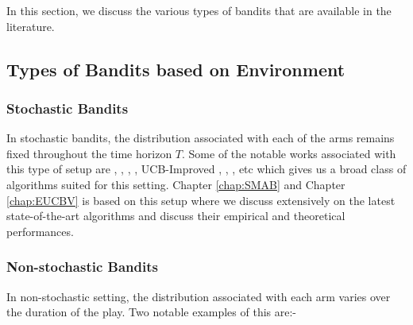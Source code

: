 In this section, we discuss the various types of bandits that are available in the literature. 


\subsection{Types of Bandits based on Environment}


\subsubsection{Stochastic Bandits}
In stochastic bandits, the distribution associated with each of the arms remains fixed throughout the time horizon $T$. Some of the notable works associated with this type of setup are \citet{robbins1952some}, \citet{lai1985asymptotically},  \citet{agrawal1995sample}, \citet{auer2002finite}, UCB-Improved \citet{auer2010ucb}, \citet{audibert2009minimax}, \citet{lattimore2015optimally}, etc which gives us a broad class of algorithms suited for this setting. Chapter \ref{chap:SMAB} and Chapter \ref{chap:EUCBV} is based on this setup where we discuss extensively on the latest state-of-the-art algorithms and discuss their empirical and theoretical performances.



\subsubsection{Non-stochastic Bandits}

In non-stochastic setting, the distribution associated with each arm varies over the duration of the play. Two notable examples of this are:-

